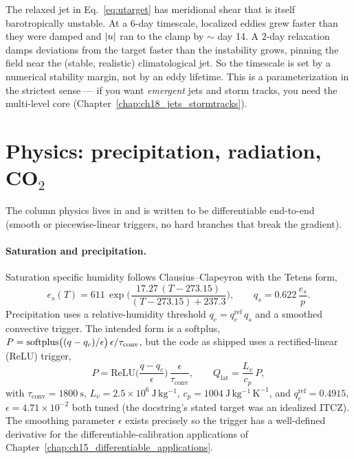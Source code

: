
\begin{remark}[Why $\tau_f=2$ days, not 6]
The relaxed jet in Eq.~\eqref{eq:utarget} has meridional shear that is itself
barotropically unstable. At a $6$-day timescale, localized eddies grew faster than
they were damped and $|u|$ ran to the clamp by $\sim$ day 14. A $2$-day
relaxation damps deviations from the target faster than the instability grows,
pinning the field near the (stable, realistic) climatological jet. So the timescale
is set by a numerical stability margin, not by an eddy lifetime. This is a
parameterization in the strictest sense --- if you want \emph{emergent} jets and
storm tracks, you need the multi-level core (Chapter~\ref{chap:ch18_jets_stormtracks}).
\end{remark}

\section{Physics: precipitation, radiation, CO\texorpdfstring{$_2$}{2}}

The column physics lives in  and is written to
be differentiable end-to-end (smooth or piecewise-linear triggers, no hard
branches that break the gradient).

\paragraph{Saturation and precipitation.}
Saturation specific humidity follows Clausius--Clapeyron with the Tetens form,
\begin{equation}
  e_s(T) = 611\,\exp\!\Big(\frac{17.27\,(T-273.15)}{(T-273.15)+237.3}\Big),
  \qquad
  q_s = 0.622\,\frac{e_s}{p}.
\end{equation}
Precipitation uses a relative-humidity threshold $q_c = q_c^{\mathrm{ref}}\,q_s$ and
a smoothed convective trigger. The intended form is a softplus,
$P=\operatorname{softplus}\!\big((q-q_c)/\epsilon\big)\,\epsilon/\tau_{\mathrm{conv}}$, but the
code as shipped uses a rectified-linear (ReLU) trigger,
\begin{equation}
  P = \mathrm{ReLU}\!\Big(\frac{q-q_c}{\epsilon}\Big)\,
      \frac{\epsilon}{\tau_{\mathrm{conv}}},
  \qquad
  Q_{\mathrm{lat}} = \frac{L_v}{c_p}\,P,
  \label{eq:precip}
\end{equation}
with $\tau_{\mathrm{conv}}=1800\ \mathrm{s}$, $L_v=2.5\times10^6\
\mathrm{J\,kg^{-1}}$, $c_p=1004\ \mathrm{J\,kg^{-1}\,K^{-1}}$, and
$q_c^{\mathrm{ref}}=0.4915$, $\epsilon=4.71\times10^{-2}$ both tuned (the
docstring's stated target was an idealized ITCZ). The smoothing parameter $\epsilon$
exists precisely so the trigger has a well-defined derivative for the
differentiable-calibration applications of
Chapter~\ref{chap:ch15_differentiable_applications}.


